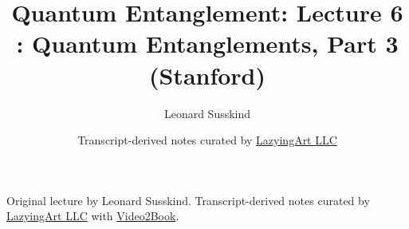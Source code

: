 \documentclass[11pt,oneside]{book}
\begin{document}
\frontmatter
\title{Quantum Entanglement: Lecture 6 : Quantum Entanglements, Part 3 (Stanford)}
\author{Leonard Susskind}
\date{Transcript-derived notes curated by \href{https://lazying.art}{LazyingArt LLC}}
\maketitle
\begin{center}
\small Original lecture by Leonard Susskind. Transcript-derived notes curated by \href{https://lazying.art}{LazyingArt LLC} with \href{https://github.com/lachlanchen/Video2Book}{Video2Book}.
\end{center}
\clearpage
\mainmatter

\end{document}
